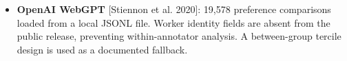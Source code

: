 \begin{itemize}
\item \textbf{OpenAI WebGPT} [Stiennon et al. 2020]: 19,578 preference comparisons loaded from a local JSONL file. Worker identity fields are absent from the public release, preventing within-annotator analysis. A between-group tercile design is used as a documented fallback.
\end{itemize}

